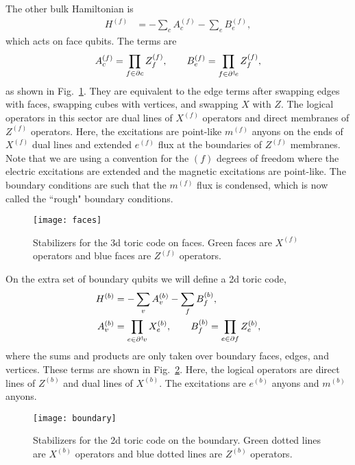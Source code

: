The other bulk Hamiltonian is 
\begin{align}
H^{(f)} &= -\sum_cA_c^{(f)} - \sum_e B_e^{(f)},
\end{align}
which acts on face qubits. The terms are 
\begin{align}
A_c^{(f)} = \prod_{f\in\partial c}Z_f^{(f)},\qquad B_e^{(f)} = \prod_{f\in\partial^\dagger\! e} Z_f^{(f)},
\end{align}
as shown in Fig.~\ref{fig:faces}. They are equivalent to the edge terms after swapping edges with faces, swapping cubes with vertices, and swapping $X$ with $Z$. The logical operators in this sector are dual lines of $X^{(f)}$ operators and direct membranes of $Z^{(f)}$ operators. Here, the excitations are point-like $m^{(f)}$ anyons on the ends of $X^{(f)}$ dual lines and extended $e^{(f)}$ flux at the boundaries of $Z^{(f)}$ membranes. Note that we are using a convention for the $(f)$ degrees of freedom where the electric excitations are extended and the magnetic excitations are point-like. The boundary conditions are such that the $m^{(f)}$ flux is condensed, which is now called the ``rough" boundary conditions.

\begin{figure}[ht!]
\centering
\texttt{[image: faces]}
\caption[Stabilizers for the 3d toric code on faces]{Stabilizers for the 3d toric code on faces. Green faces are $X^{(f)}$ operators and blue faces are $Z^{(f)}$ operators.}
\label{fig:faces}
\end{figure}

On the extra set of boundary qubits we will define a 2d toric code,
\begin{align}
\begin{aligned}
H^{(b)} &= -\sum_vA_v^{(b)} - \sum_f B_f^{(b)},\\
A_v^{(b)} &= \prod_{e\in\partial^\dagger\! v}X_e^{(b)},\qquad B_f^{(b)} = \prod_{e\in\partial f} Z_e^{(b)},
\end{aligned}
\end{align}
where the sums and products are only taken over boundary faces, edges, and vertices. These terms are shown in Fig.~\ref{fig:boundary}. Here, the logical operators are direct lines of $Z^{(b)}$ and dual lines of $X^{(b)}$. The excitations are $e^{(b)}$ anyons and $m^{(b)}$ anyons.

\begin{figure}
\centering
\texttt{[image: boundary]}
\caption[Stabilizers for the 2d toric code on the boundary]{Stabilizers for the 2d toric code on the boundary. Green dotted lines are $X^{(b)}$ operators and blue dotted lines are $Z^{(b)}$ operators.}
\label{fig:boundary}
\end{figure}

